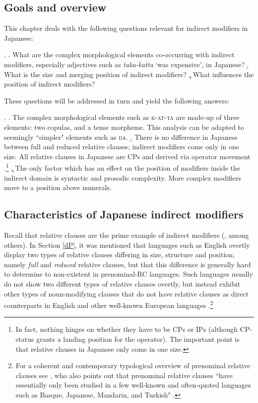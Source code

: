 \subsection{Goals and overview}

This chapter deals with the following questions relevant for indirect modifiers in Japanese:

\ex. \a. What are the complex morphological elements co-occurring with indirect modifiers, especially adjectives such as \textit{taka-katta} `was expensive', in Japanese?
\b. What is the size and merging position of indirect modifiers?
\c. What influences the position of indirect modifiers?

These questions will be addressed in turn and yield the following answers:

\ex. \a. The complex morphological elements such as \textsc{k-at-ta} are made-up of three elements: two copulas, and a tense morpheme. This analysis can be adapted to seemingly ``simpler" elements such as \textsc{da}.
\b. There is no difference in Japanese between full and reduced relative clauses;  indirect modifiers come only in one size. All relative clauses in Japanese are CPs and derived via operator movement \citep{miyamoto:2017:RC}.\footnote{In fact, nothing hinges on whether they have to be CPs or IPs (although CP-status grants a landing position for the operator). The important point is that relative clauses in Japanese only come in one size.} \c. The only factor which has an effect on the position of modifiers inside the indirect domain is syntactic and prosodic complexity. More complex modifiers move to a position above numerals.

\subsection{Characteristics of Japanese indirect modifiers} \label{nishiyama analysis}

Recall that relative clauses are the prime example of indirect modifiers (\citealt{cinque:2010:adj, cinque:2020:relcl}, among others). In Section \ref{dP}, it was mentioned that languages such as  English overtly display two types of relative clauses differing in size, structure and position, namely \textit{full} and \textit{reduced} relative clauses, but that this difference is generally hard to determine to non-existent in prenominal-RC languages. Such languages usually do not show two different types of relative clauses overtly, but instead exhibit other types of noun-modifying clauses that do not have relative clauses as direct counterparts in English and other well-known European languages \citep{keenan:1977:noun, lehmann:1984:der, vries:2002:syntax, wu:2011:syntax}.\footnote{For a coherent and contemporary typological overview of prenominal relative clauses see \citet{wu:2011:syntax}, who also points out that prenominal relative clauses ``have essentially only been studied in a few well-known and often-quoted languages such as Basque, Japanese, Mandarin, and Turkish" \citep[569]{wu:2011:syntax}.}    

